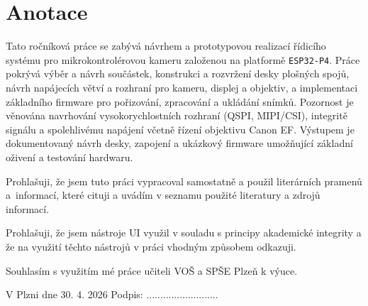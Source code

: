 \documentclass[12pt, a4paper, oneside]{report}
\begin{document}
\newpage
\chapter*{Anotace} \indent
\thispagestyle{empty}

Tato ročníková práce se zabývá návrhem a prototypovou realizací řídicího systému pro mikrokontrolérovou kameru založenou na platformě \texttt{ESP32-P4}. Práce pokrývá výběr a návrh součástek, konstrukci a rozvržení desky plošných spojů, návrh napájecích větví a rozhraní pro kameru, displej a objektiv, a implementaci základního firmware pro pořizování, zpracování a ukládání snímků. Pozornost je věnována navrhování vysokorychlostních rozhraní (QSPI, MIPI/CSI), integritě signálu a spolehlivému napájení včetně řízení objektivu Canon EF. Výstupem je dokumentovaný návrh desky, zapojení a ukázkový firmware umožňující základní oživení a testování hardwaru.
\vfill

Prohlašuji, že jsem tuto práci vypracoval samostatně a použil literárních pramenů a~\mbox{informací}, které cituji a uvádím v seznamu použité literatury a zdrojů informací.

Prohlašuji, že jsem nástroje UI využil v souladu s principy akademické integrity a že na využití těchto nástrojů v práci vhodným způsobem odkazuji.

Souhlasím s využitím mé práce učiteli VOŠ a SPŠE Plzeň k výuce.

\vspace{1cm}

V Plzni dne 30. 4. 2026 \hfill Podpis: ..........................

\newpage
\tableofcontents
\thispagestyle{empty}

\newpage
\end{document}
